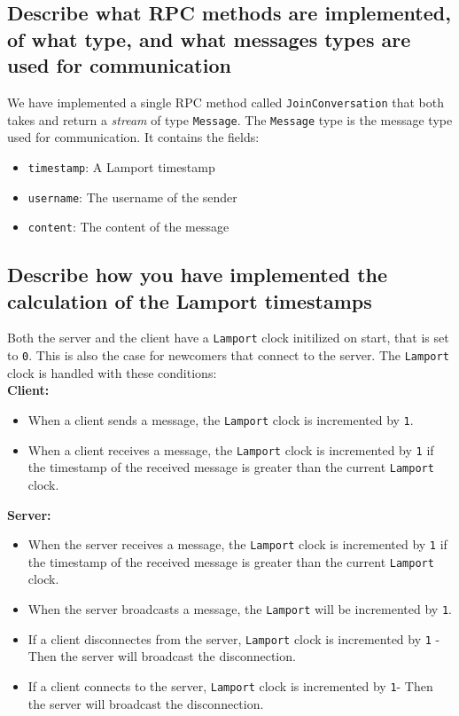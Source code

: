 \documentclass[a4paper,11pt]{article}
\begin{document}
\subsection*{Describe what  RPC methods are implemented, of what type, and what messages types are used for communication}
We have implemented a single RPC method called \verb|JoinConversation| that both takes and return a \textit{stream} of type \verb|Message|.
The \verb|Message| type is the message type used for communication. It contains the fields:
\begin{itemize}
    \item \verb|timestamp|: A Lamport timestamp
    \item \verb|username|: The username of the sender
    \item \verb|content|: The content of the message
\end{itemize} 

\subsection*{Describe how you have implemented the calculation of the Lamport timestamps}
Both the server and the client have a \verb|Lamport| clock initilized on start, that is set to \verb|0|. This is also the case for newcomers that connect to the server. 
The \verb|Lamport| clock is handled with these conditions:\\
\textbf{Client:}
\begin{itemize}
    \item When a client sends a message, the \verb|Lamport| clock is incremented by \verb|1|.
    \item When a client receives a message, the \verb|Lamport| clock is incremented by \verb|1| if the timestamp of the received message is greater than the current \verb|Lamport| clock.
\end{itemize}
\textbf{Server:}
\begin{itemize}
    \item When the server receives a message, the \verb|Lamport| clock is incremented by \verb|1| if the timestamp of the received message is greater than the current \verb|Lamport| clock.
    \item When the server broadcasts a message, the \verb|Lamport| will be incremented by \verb|1|.
    \item If a client disconnectes from the server, \verb|Lamport| clock is incremented by \verb|1| - Then the server will broadcast the disconnection.
    \item If a client connects to the server, \verb|Lamport| clock is incremented by \verb|1|- Then the server will broadcast the disconnection.
\end{itemize}
\end{document}
